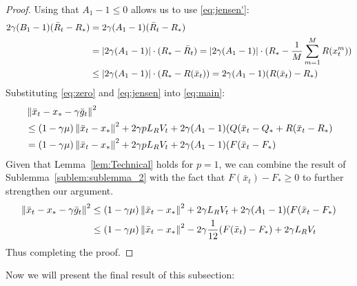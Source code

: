 \begin{proof}
    Using that $A_1 - 1 \leq 0$ allows us to use \eqref{eq:jensen'}:
    \begin{align}
        2\gamma (B_1 - 1)(\bar{R}_t - R_*) &= 2\gamma (A_1 - 1)(\bar{R}_t - R_*) \\
        &= |2\gamma (A_1 - 1)| \cdot (R_* - \bar{R}_t) = |2\gamma (A_1 - 1)| \cdot (R_* - \fsumm{m=1}{M}{R(x^m_t})) \\
        &\leq |2\gamma (A_1 - 1)| \cdot (R_* - R(\bar{x}_t)) = 2\gamma (A_1 - 1) (R(\bar{x}_t) - R_*) \label{eq:jensen}
    \end{align}
    Substituting \eqref{eq:zero} and \eqref{eq:jensen} into \eqref{eq:main}:
    \begin{align}
        &\norm{\bar{x}_t - x_* - \gamma \bar{g}_t}^2 \\
        &\leq (1 - \gamma \mu)\norm{\bar{x}_t - x_*}^2 + 2 \gamma p L_R V_t
        + 2\gamma (A_1 - 1)(Q(\bar{x}_t - Q_* + R(\bar{x}_t - R_*) \\
        &= (1 - \gamma \mu)\norm{\bar{x}_t - x_*}^2 + 2 \gamma p L_R V_t
        + 2\gamma (A_1 - 1)(F(\bar{x}_t - F_*)
    \end{align}
    Given that Lemma~\ref{lem:Technical} holds for $p = 1$, we can combine the result of Sublemma~\ref{sublem:sublemma_2} with the fact that $F(\bar{x}_t) - F_* \geq 0$ to further strengthen our argument.
    \begin{align}
        \norm{\bar{x}_t - x_* - \gamma \bar{g}_t}^2 &
        \leq (1 - \gamma \mu)\norm{\bar{x}_t - x_*}^2 + 2 \gamma L_R V_t
        + 2\gamma (A_1 - 1)(F(\bar{x}_t - F_*) \\
        &\leq (1 - \gamma \mu)\norm{\bar{x}_t - x_*}^2 - 2\gamma \frac{1}{12}(F(\bar{x}_t) - F_*) + 2 \gamma L_R V_t
    \end{align}
    Thus completing the proof.
\end{proof}


Now we will present the final result of this subsection:


